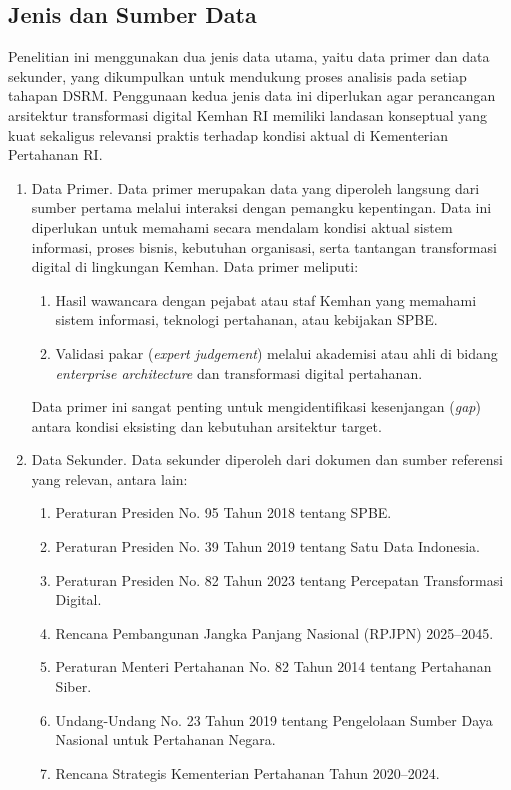 \subsection{Jenis dan Sumber Data}
Penelitian ini menggunakan dua jenis data utama, yaitu data primer dan data sekunder, yang dikumpulkan untuk mendukung proses analisis pada setiap tahapan DSRM.
Penggunaan kedua jenis data ini diperlukan agar perancangan arsitektur transformasi digital Kemhan RI memiliki landasan konseptual yang kuat sekaligus relevansi praktis terhadap kondisi aktual di Kementerian Pertahanan RI.
\begin{enumerate}
  \item Data Primer.
  Data primer merupakan data yang diperoleh langsung dari sumber pertama melalui interaksi dengan pemangku kepentingan.
  Data ini diperlukan untuk memahami secara mendalam kondisi aktual sistem informasi, proses bisnis, kebutuhan organisasi, serta tantangan transformasi digital di lingkungan Kemhan. Data primer meliputi:
  \begin{enumerate}
    \item Hasil wawancara dengan pejabat atau staf Kemhan yang memahami sistem informasi, teknologi pertahanan, atau kebijakan SPBE.
    \item Validasi pakar (\textit{expert judgement}) melalui akademisi atau ahli di bidang \textit{enterprise architecture} dan transformasi digital pertahanan.
  \end{enumerate}
  Data primer ini sangat penting untuk mengidentifikasi kesenjangan (\textit{gap}) antara kondisi eksisting dan kebutuhan arsitektur target.
  \item Data Sekunder.
  Data sekunder diperoleh dari dokumen dan sumber referensi yang relevan, antara lain:
  \begin{enumerate}
    \item Peraturan Presiden No. 95 Tahun 2018 tentang SPBE.
    \item Peraturan Presiden No. 39 Tahun 2019 tentang Satu Data Indonesia.
    \item Peraturan Presiden No. 82 Tahun 2023 tentang Percepatan Transformasi Digital.
    \item Rencana Pembangunan Jangka Panjang Nasional (RPJPN) 2025--2045.
    \item Peraturan Menteri Pertahanan No. 82 Tahun 2014 tentang Pertahanan Siber.
    \item Undang-Undang No. 23 Tahun 2019 tentang Pengelolaan Sumber Daya Nasional untuk Pertahanan Negara.
    \item Rencana Strategis Kementerian Pertahanan Tahun 2020--2024.

\end{enumerate}
\end{enumerate}

